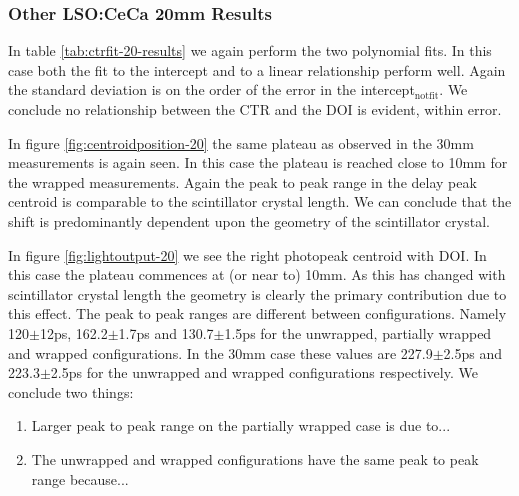 \subsubsection{Other LSO:CeCa 20mm Results}
In table \ref{tab:ctrfit-20-results} we again perform the two polynomial fits. In this case both the fit to the intercept and to a linear relationship perform well. Again the standard deviation is on the order of the error in the intercept$_\text{notfit}$. We conclude no relationship between the CTR and the DOI is evident, within error. 

In figure \ref{fig:centroidposition-20} the same plateau as observed in the 30mm measurements is again seen. In this case the plateau is reached close to 10mm for the wrapped measurements. Again the peak to peak range in the delay peak centroid is comparable to the scintillator crystal length. We can conclude that the shift is predominantly dependent upon the geometry of the scintillator crystal. 

In figure \ref{fig:lightoutput-20} we see the right photopeak centroid with DOI. In this case the plateau commences at (or near to) 10mm. As this has changed with scintillator crystal length the geometry is clearly the primary contribution due to this effect. The peak to peak ranges are different between configurations. Namely 120$\pm$12ps, 162.2$\pm$1.7ps and 130.7$\pm$1.5ps for the unwrapped, partially wrapped and wrapped configurations. In the 30mm case these values are 227.9$\pm$2.5ps and 223.3$\pm$2.5ps for the unwrapped and wrapped configurations respectively. We conclude two things:

\begin{enumerate}
\item Larger peak to peak range on the partially wrapped case is due to...
\item The unwrapped and wrapped configurations have the same peak to peak range because...
\end{enumerate}